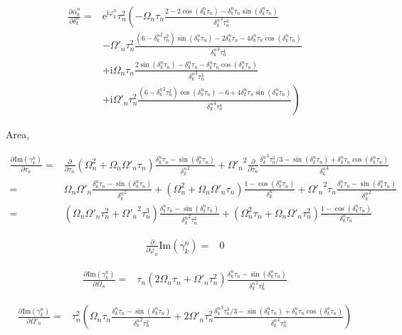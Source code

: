 \documentclass[10pt,fleqn]{article}
\newcommand{\ue}{\mathrm{e}}
\newcommand{\ui}{\mathrm{i}}
\newcommand{\eqar}[1]
{
  \begin{align*}
    #1
  \end{align*}
}
\newcommand{\paren}[1]{{\left({#1}\right)}}
\newcommand{\lparen}[1]{{\left({#1}\right.}}
\newcommand{\rparen}[1]{{\left.{#1}\right)}}
\newcommand{\pdiff}[3][{}]{{\frac{\partial^{#1} {#2}}{\partial {#3}{}^{#1}}}}
\begin{document}
\eqar{
  \pdiff{\bar\alpha_k^n}{\delta_k^n}=&\ue^{\ui\varphi_k^n}\tau_n^2
  \lparen{
    -\Omega_n\tau_n\frac{2-2\cos\paren{{\delta_k^n}\tau_n}-{\delta_k^n}\tau_n\sin\paren{{\delta_k^n}\tau_n}}{{\delta_k^n}^3\tau_n^3}
  }\\
  &-\Omega'_n\tau_n^2\frac{
    \paren{6-{\delta_k^n}^2\tau_n^2}\sin\paren{{\delta_k^n}\tau_n}
    -2{\delta_k^n}\tau_n
    -4{\delta_k^n}\tau_n\cos\paren{{\delta_k^n}\tau_n}
  }{{\delta_k^n}^4\tau_n^4}\\
  &+\ui\Omega_n\tau_n\frac{2\sin\paren{{\delta_k^n}\tau_n}-\delta_k^n\tau_n-\delta_k^n\tau_n\cos\paren{{\delta_k^n}\tau_n}}{{\delta_k^n}^3\tau_n^3}\\
  &\rparen{
    +\ui\Omega'_n\tau_n^2\frac{
      \paren{6-{\delta_k^n}^2\tau_n^2}\cos\paren{{\delta_k^n}\tau_n}
      -6
      +4{\delta_k^n}\tau_n\sin\paren{{\delta_k^n}\tau_n}
    }{{\delta_k^n}^4\tau_n^4}
  }
}
Area,
\eqar{
  \pdiff{\mathrm{Im}\paren{\gamma_k^n}}{\tau_n}=&\pdiff{}{\tau_n}\paren{\Omega_n^2+\Omega_n\Omega'_n\tau_n}\frac{\delta_k^n\tau_n-\sin\paren{{\delta_k^n}\tau_n}}{{\delta_k^n}^2}
  +{\Omega'_n}^2\pdiff{}{\tau_n}\frac{
    {\delta_k^n}^3\tau_n^3/3
    -\sin\paren{{\delta_k^n}\tau_n}
    +{\delta_k^n}\tau_n\cos\paren{{\delta_k^n}\tau_n}
  }{{\delta_k^n}^4}\\
  =&\Omega_n\Omega'_n\frac{\delta_k^n\tau_n-\sin\paren{{\delta_k^n}\tau_n}}{{\delta_k^n}^2}
  +\paren{\Omega_n^2+\Omega_n\Omega'_n\tau_n}\frac{
    1-\cos\paren{{\delta_k^n}\tau_n}
  }{{\delta_k^n}}
  +{\Omega'_n}^2\tau_n\frac{
    {\delta_k^n}\tau_n
    -\sin\paren{{\delta_k^n}\tau_n}
  }{{\delta_k^n}^2}\\
  =&\paren{\Omega_n\Omega'_n\tau_n^2+{\Omega'_n}^2\tau_n^3}\frac{\delta_k^n\tau_n-\sin\paren{{\delta_k^n}\tau_n}}{{\delta_k^n}^2\tau_n^2}
  +\paren{\Omega_n^2\tau_n+\Omega_n\Omega'_n\tau_n^2}\frac{
    1-\cos\paren{{\delta_k^n}\tau_n}
  }{{\delta_k^n}\tau_n}
}
\eqar{
  \pdiff{}{\varphi_n}\mathrm{Im}\paren{\gamma_k^n}=&0
}
\eqar{
  \pdiff{\mathrm{Im}\paren{\gamma_k^n}}{\Omega_n}=&\tau_n\paren{2\Omega_n\tau_n+\Omega'_n\tau_n^2}\frac{\delta_k^n\tau_n-\sin\paren{{\delta_k^n}\tau_n}}{{\delta_k^n}^2\tau_n^2}
}
\eqar{
  \pdiff{\mathrm{Im}\paren{\gamma_k^n}}{\Omega'_n}=&\tau_n^2\paren{\Omega_n\tau_n\frac{\delta_k^n\tau_n-\sin\paren{{\delta_k^n}\tau_n}}{{\delta_k^n}^2\tau_n^2}
    +2{\Omega'_n}\tau_n^2\frac{
      {\delta_k^n}^3\tau_n^3/3
      -\sin\paren{{\delta_k^n}\tau_n}
      +{\delta_k^n}\tau_n\cos\paren{{\delta_k^n}\tau_n}
    }{{\delta_k^n}^4\tau_n^4}}
}
\end{document}
